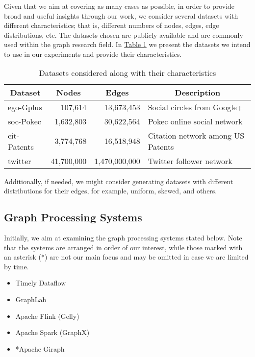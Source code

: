 \documentclass[a4paper,11pt]{article}
\begin{document}
\par Given that we aim at covering as many cases as possible, in order to provide broad and useful insights through our work, we consider several datasets with different characteristics; that is, different numbers of nodes, edges, edge distributions, etc. The datasets chosen are publicly available and are commonly used within the graph research field. In \hyperref[dataset-table]{Table 1} we present the datasets we intend to use in our experiments and provide their characteristics.

\bigskip

\begin{table}[H]
	\centering
	\begin{tabular}{|l|r|r|l|}
	\hline
	\multicolumn{1}{|c|}{\textbf{Dataset}} & \multicolumn{1}{c|}{\textbf{Nodes}} & \multicolumn{1}{c|}{\textbf{Edges}} & \multicolumn{1}{c|}{\textbf{Description}} \\ \hline
	\hline
	ego-Gplus \cite{snapnets} & 107,614 & 13,673,453 & Social circles from Google+ \\ \hline
	soc-Pokec \cite{snapnets} & 1,632,803 & 30,622,564 & Pokec online social network \\ \hline
	cit-Patents \cite{snapnets} & 3,774,768 & 16,518,948 & Citation network among US Patents \\ \hline
	twitter \cite{twitter} & 41,700,000 & 1,470,000,000 & Twitter follower network \\ \hline
	\end{tabular}
	\caption{Datasets considered along with their characteristics}
	\label{dataset-table}
\end{table}

\par Additionally, if needed, we might consider generating datasets with different distributions for their edges, for example, uniform, skewed, and others.

\subsection{Graph Processing Systems} \label{graph-proc}

\par Initially, we aim at examining the graph processing systems stated below. Note that the systems are arranged in order of our interest, while those marked with an asterisk (*) are not our main focus and may be omitted in case we are limited by time.

\begin{itemize}

	\item Timely Dataflow \cite{naiad, timelydf}
	\item GraphLab \cite{graphlab}
	\item Apache Flink (Gelly) \cite{flink}
	\item Apache Spark (GraphX) \cite{spark,graphxpaper}
	\item *Apache Giraph \cite{giraph}

\end{itemize}
\end{document}
